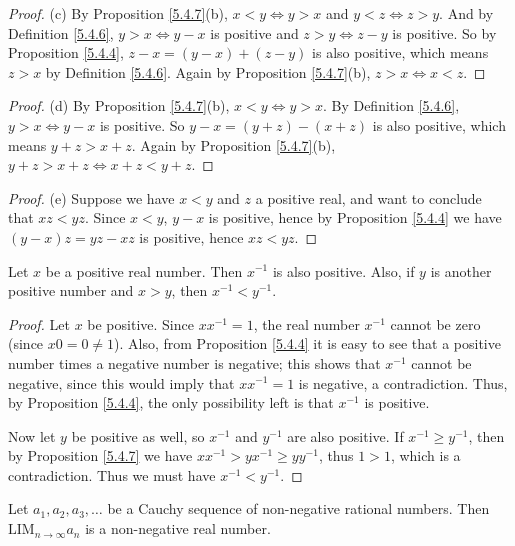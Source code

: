 \begin{proof}{(c)}
By Proposition \ref{5.4.7}(b), \(x < y \iff y > x\) and \(y < z \iff z > y\).
And by Definition \ref{5.4.6}, \(y > x \iff y - x\) is positive and \(z > y \iff z - y\) is positive.
So by Proposition \ref{5.4.4}, \(z - x = (y - x) + (z - y)\) is also positive, which means \(z > x\) by Definition \ref{5.4.6}.
Again by Proposition \ref{5.4.7}(b), \(z > x \iff x < z\).
\end{proof}

\begin{proof}{(d)}
By Proposition \ref{5.4.7}(b), \(x < y \iff y > x\).
By Definition \ref{5.4.6}, \(y > x \iff y - x\) is positive.
So \(y - x = (y + z) - (x + z)\) is also positive, which means \(y + z > x + z\).
Again by Proposition \ref{5.4.7}(b), \(y + z > x + z \iff x + z < y + z\).
\end{proof}

\begin{proof}{(e)}
Suppose we have \(x < y\) and \(z\) a positive real, and want to conclude that \(xz < yz\).
Since \(x < y\), \(y - x\) is positive, hence by Proposition \ref{5.4.4} we have \((y - x)z = yz - xz\) is positive, hence \(xz < yz\).
\end{proof}

\begin{proposition}\label{5.4.8}
Let \(x\) be a positive real number.
Then \(x^{-1}\) is also positive.
Also, if \(y\) is another positive number and \(x > y\), then \(x^{-1} < y^{-1}\).
\end{proposition}

\begin{proof}
Let \(x\) be positive.
Since \(xx^{-1} = 1\), the real number \(x^{-1}\) cannot be zero (since \(x0 = 0 \neq 1\)).
Also, from Proposition \ref{5.4.4} it is easy to see that a positive number times a negative number is negative;
this shows that \(x^{-1}\) cannot be negative, since this would imply that \(xx^{-1} = 1\) is negative, a contradiction.
Thus, by Proposition \ref{5.4.4}, the only possibility left is that \(x^{-1}\) is positive.

Now let \(y\) be positive as well, so \(x^{-1}\) and \(y^{-1}\) are also positive.
If \(x^{-1} \geq y^{-1}\), then by Proposition \ref{5.4.7} we have \(xx^{-1} > yx^{-1} \geq yy^{-1}\), thus \(1 > 1\), which is a contradiction.
Thus we must have \(x^{-1} < y^{-1}\).
\end{proof}

\begin{proposition}\label{5.4.9}
Let \(a_1, a_2, a_3, \dots\) be a Cauchy sequence of non-negative rational numbers.
Then \(\text{LIM}_{n \to \infty} a_n\) is a non-negative real number.
\end{proposition}

